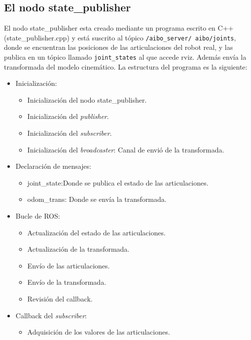 \documentclass[12pt,a4paper,final,twoside]{book}
\begin{document}
\subsection{El nodo state{\_}publisher}\label{nodoSP}
El nodo state{\_}publisher esta creado mediante un programa escrito en C++ (state{\_}publisher.cpp) y está suscrito al tópico \texttt{/aibo{\_}server/ aibo/joints}, donde se encuentran las posiciones de las articulaciones del robot real, y las publica en un tópico llamado \texttt{joint{\_}states} al que accede rviz. Además envía la transformada del modelo cinemático.
La estructura del programa es la siguiente:
\begin{itemize}
\item Inicialización:
\begin{itemize}
\item Inicialización del nodo state{\_}publisher.
\item Inicialización del \textit{publisher}.
\item Inicialización del \textit{subscriber}.
\item Inicialización del \textit{broadcaster}: Canal de envió de la transformada. 
\end{itemize}
\item Declaración de mensajes:
\begin{itemize}
\item joint{\_}state:Donde se publica el estado de las articulaciones.
\item odom{\_}trans: Donde se envía la transformada.
\end{itemize}
\item Bucle de ROS:
\begin{itemize}
\item Actualización del estado de las articulaciones.
\item Actualización de la transformada.
\item Envío de las articulaciones.
\item Envío de la transformada.
\item Revisión del callback. 
\end{itemize}
\item Callback del \textit{subscriber}:
\begin{itemize}
\item Adquisición de los valores de las articulaciones.
\end{itemize}
\end{itemize}
\end{document}
